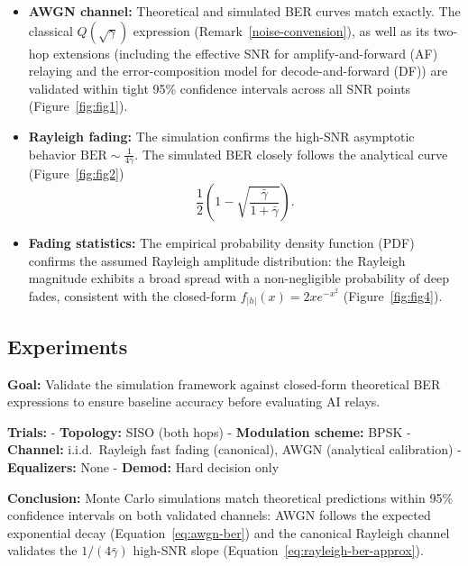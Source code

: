 \begin{itemize}
  \item \textbf{AWGN channel:} Theoretical and simulated BER curves match exactly. The classical $Q(\sqrt{\gamma})$ expression (Remark~\ref{noise-convension}), as well as its two-hop extensions (including the effective SNR for amplify-and-forward (AF) relaying and the error-composition model for decode-and-forward (DF)) are validated within tight 95\% confidence intervals across all SNR points (Figure~\ref{fig:fig1}).

  \item \textbf{Rayleigh fading:} The simulation confirms the high-SNR asymptotic behavior $\mathrm{BER} \sim \frac{1}{4\bar{\gamma}}$. The simulated BER closely follows the analytical curve (Figure~\ref{fig:fig2})
  \[
    \frac{1}{2}\!\left(1 - \sqrt{\frac{\bar{\gamma}}{1+\bar{\gamma}}}\right).
  \]

  \item \textbf{Fading statistics:} The empirical probability density function (PDF) confirms the assumed Rayleigh amplitude distribution: the Rayleigh magnitude exhibits a broad spread with a non-negligible probability of deep fades, consistent with the closed-form $f_{|h|}(x)=2xe^{-x^2}$ (Figure~\ref{fig:fig4}).

\end{itemize}

\subsection{Experiments}\label{sec:experiments_channel_models_validation}

\textbf{Goal:} Validate the simulation framework against closed-form theoretical BER expressions to ensure baseline accuracy before evaluating AI relays.

\textbf{Trials:} - \textbf{Topology:} SISO (both hops) - \textbf{Modulation scheme:} BPSK - \textbf{Channel:} i.i.d.\ Rayleigh fast fading (canonical), AWGN (analytical calibration) - \textbf{Equalizers:} None - \textbf{Demod:} Hard decision only

\textbf{Conclusion:} Monte Carlo simulations match theoretical predictions within 95\% confidence intervals on both validated channels: AWGN follows the expected exponential decay (Equation~\ref{eq:awgn-ber}) and the canonical Rayleigh channel validates the \(1/(4\bar{\gamma})\) high-SNR slope (Equation~\ref{eq:rayleigh-ber-approx}).

